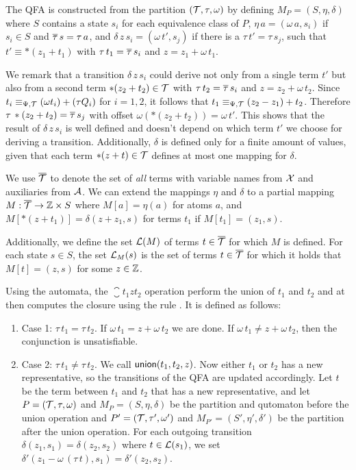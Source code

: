 The QFA is constructed from the partition  $(\mathcal{T}, \tau, \omega)$ by defining $M_P = (S, \eta, \delta)$ where $S$ contains a state $s_i$ for each equivalence class of $P$,
$\eta\,a = (\omega\,a, s_i)$ if $s_i \in S$ and $\overline{\tau}\,s = \tau\,a$,
and $\delta\,z\,s_i = (\omega\,t', s_j)$ if there is a $\tau\,t'=\tau\,s_j$, such that $t' \equiv *(z_1 + t_1)$ with $\tau \,t_1= \overline{\tau}\,s_i$ and $z = z_1 + \omega\,t_1$.

We remark that a transition $\delta\,z\,s_i$ could derive not only from a single term $t'$ but also from a second term $*(z_2 + t_2) \in \mathcal{T}$ with $\tau\,t_2=\overline{\tau}\,s_i$ and $z = z_2 + \omega\,t_2$.
Since $t_i \equiv_{\Psi,\mathcal{T}} (\omega t_i) + (\tau Q_i)$ for $i = 1,2$, it follows that $t_1 \equiv_{\Psi,\mathcal{T}} (z_2 - z_1)+ t_2$.
Therefore $\tau\,*(z_2+t_2)=\overline{\tau}\,s_j$ with offset $\omega(*(z_2+t_2)) = \omega\,t'$.
This shows that the result of $\delta\,z\,s_i$ is well defined and doesn't depend on which term $t'$ we choose for deriving a transition.
Additionally, $\delta$ is defined only for a finite amount of values, given that each term $*(z + t) \in \mathcal{T}$ defines at most one mapping for $\delta$.

We use ${\overline{\mathcal{T}}}$ to denote the set of \emph{all} terms with variable names from $\mathcal{X}$ and auxiliaries from $\mathcal{A}$.
We can extend the mappings $\eta$ and $\delta$ to a partial mapping $M : {\overline{\mathcal{T}}} \rightarrow \mathbb{Z} \times S$ where $M[a] = \eta(a)$ for atoms $a$, and $M[*(z+t_1)] = \delta(z+z_1, s)$ for terms $t_1$ if $M[t_1] = (z_1,s)$.

Additionally, we define the set $\mathcal{L}(M)$ of terms $t \in {\overline{\mathcal{T}}}$ for which $M$ is defined.
For each state $s \in S$, the set $\mathcal{L}_M(s)$ is the set of terms $t \in {\overline{\mathcal{T}}}$ for which it holds that $M[t] = (z, s)$ for some $z \in \mathbb{Z}$.

Using the automata, the $\closure{t_1}{z}{t_2}$ operation perform the union of $t_1$ and $t_2$ and at
then computes the closure using the rule .
It is defined as follows:

\begin{enumerate}
  \item Case 1: $\tau\,t_1 = \tau\,t_2$. If $\omega\,t_1 = z + \omega\,t_2$ we are done.
  If $\omega\,t_1 \neq z + \omega\,t_2$, then the conjunction is unsatisfiable.
  \item Case 2: $\tau\,t_1 \neq \tau\,t_2$. We call $\textsf{union}(t_1, t_2, z)$.
  Now either $t_1$ or $t_2$ has a new representative, so the transitions of the QFA are updated accordingly.
  Let $t$ be the term between $t_1$ and $t_2$ that has a new representative,
  and let $P = (\mathcal{T}, \tau, \omega)$ and $M_P = (S, \eta, \delta)$ be the partition and qutomaton before the union operation
  and $P' = (\mathcal{T}, \tau', \omega')$ and $M_{P'} = (S', \eta', \delta')$ be the partition after the union operation.
  For each outgoing transition $\delta(z_1, s_1) = \delta(z_2, s_2)$ where $t \in \mathcal{L}(s_1)$,
  we set $\delta'(z_1 - \omega\,(\tau\,t), s_1) = \delta'(z_2, s_2)$.
\end{enumerate}

